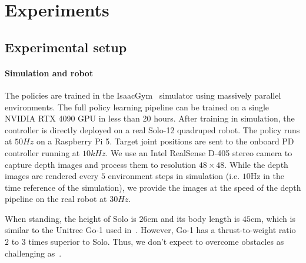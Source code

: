 \section{Experiments}

\subsection{Experimental setup}\label{sec:experiments:setup}

\paragraph{Simulation and robot}
The policies are trained in the IsaacGym~\citep{makoviychuk2021isaac} simulator using massively parallel environments.
The full policy learning pipeline can be trained on a single NVIDIA RTX 4090 GPU in less than 20 hours.
After training in simulation, the controller is directly deployed on a real Solo-12 quadruped robot.
The policy runs at $50 Hz$ on a Raspberry Pi 5.
Target joint positions are sent to the onboard PD controller running at $10 kHz$.
We use an Intel RealSense D-405 stereo camera to capture depth images and process them to resolution $48 \times 48$.
While the depth images are rendered every $5$ environment steps in simulation (i.e. $10$Hz in the time reference of the simulation), we provide the images at the speed of the depth pipeline on the real robot at $30Hz$.

When standing, the height of Solo is $26$cm and its body length is $45$cm, which is similar to the Unitree Go-1 used in~\citep{zhuang2023robot, cheng2023parkour}.
However, Go-1 has a thrust-to-weight ratio $2$ to $3$ times superior to Solo.
Thus, we don't expect to overcome obstacles as challenging as~\citep{zhuang2023robot, cheng2023parkour}.

